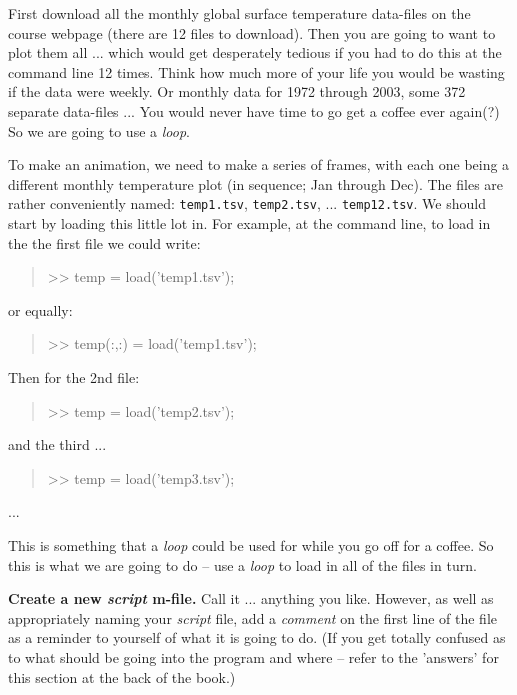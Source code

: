 \documentclass{tufte-book} %
\newenvironment{docspec}{\begin{quotation}\ttfamily\parskip0pt\parindent0pt\ignorespaces}{\end{quotation}}
\begin{document}
First download all the monthly global surface temperature data-files on the  course webpage (there are 12 files to download). Then you are going to want to plot them all ... which would get desperately tedious if you had to do this at the command line 12 times. Think how much more of your life you would be wasting if the data were weekly. Or monthly data for 1972 through 2003, some 372 separate data-files ... You would never have time to go get a coffee ever again(?) So we are going to use a \textit{loop}.

To make an animation, we need to make a series of frames, with each one being a different monthly temperature plot (in sequence; Jan through Dec). The files are rather conveniently named: \texttt{temp1.tsv}, \texttt{temp2.tsv}, ... \texttt{temp12.tsv}. We should start by loading this little lot in. For example, at the command line, to load in the the first file we could write:
\begin{docspec}
>> temp = load('temp1.tsv');
\end{docspec}
or equally:
\begin{docspec}
>> temp(:,:) = load('temp1.tsv');
\end{docspec}
Then for the 2nd file:
\begin{docspec}
>> temp = load('temp2.tsv');
\end{docspec}
and the third ...
\begin{docspec}
>> temp = load('temp3.tsv');
\end{docspec}
...

\newpage
This is something that a \textit{loop} could be used for while you go off for a coffee. So this is what we are going to do -- use a \textit{loop} to load in all of the files in turn.

\textbf{Create a new \textit{script} \textsf{m-file}.} Call it ... anything you like. However, as well as appropriately naming your \textit{script} file, add a \textit{comment} on the first line of the file as a reminder to yourself of what it is going to do. (If you get totally confused as to what should be going into the program and where -- refer to the 'answers' for this section at the back of the book.)
\end{document}
